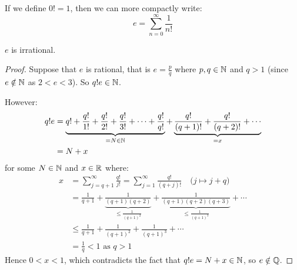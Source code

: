 \documentclass[../main.tex]{subfiles}
\begin{document}
If we define $0! = 1$, then we can more compactly write:
\[
  e = \sum_{n=0}^{\infty} \frac{1}{n!}
\]
\begin{proposition}[Irrationality of $e$]
  $e$ is irrational.
\end{proposition}
\begin{proof}
  Suppose that $e$ is rational, that is $e = \frac{p}{q}$  where $p, q \in \mathbb{N}$ and $q > 1$ (since $e \notin \mathbb{N}$ as $2 < e < 3$).
  So $q!e \in \mathbb{N}$.

  However:
  \begin{align*}
    q!e &= \underbrace{q! + \frac{q!}{1!} + \frac{q!}{2!} + \frac{q!}{3!} + \cdots + \frac{q!}{q!}}_{= N \in \mathbb{N}} + \underbrace{\frac{q!}{(q + 1)!} + \frac{q!}{(q+ 2)!} + \cdots }_{= x} \\
        &= N + x
  \end{align*}
  for some $N \in \mathbb{N}$ and $x \in \mathbb{R}$ where:
  \begin{align*}
    x &= \sum_{j = q + 1}^{\infty} \frac{q!}{j!} = \sum_{j = 1}^{\infty} \frac{q!}{(q + j)!}\quad\text{($j \mapsto j + q$)}\\
      &= \frac{1}{q + 1} + \underbrace{\frac{1}{(q + 1)(q + 2)}}_{\leq \frac{1}{(q + 1)^2}} + \underbrace{\frac{1}{(q + 1)(q + 2)(q + 3)}}_{\leq \frac{1}{(q + 1)^3}} + \cdots \\
      &\leq \frac{1}{q + 1} + \frac{1}{(q + 1)^2} + \frac{1}{(q + 1)^3} + \cdots \\
      &= \frac{1}{q} < 1 \text{ as $q > 1$}
  \end{align*}
  Hence $0 < x < 1$, which contradicts the fact that $q!e = N + x \in \mathbb{N}$, so $e \notin \mathbb{Q}$.
\end{proof}
\end{document}
